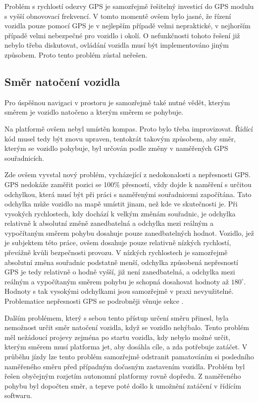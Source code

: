 \documentclass[czech, bachelor]{diploma}
\begin{document}
Problém s rychlostí odezvy GPS je samozřejmě řešitelný investicí do GPS modulu s vyšší obnovovací frekvencí. V tomto momentě ovšem
bylo jasné, že řízení vozidla pouze pomocí GPS je v nejlepším případě velmi nepraktické, v nejhorším případě velmi nebezpečné
pro vozidlo i okolí. O nefunkčnosti tohoto řešení již nebylo třeba diskutovat, ovládání vozidla musí být implementováno jiným 
způsobem. Proto tento problém zůstal neřešen.

\subsection{Směr natočení vozidla} \label{directions-and-angles}

Pro úspěšnou navigaci v prostoru je samozřejmě také nutné vědět, kterým směrem je vozidlo natočeno a kterým směrem se pohybuje.

Na platformě ovšem nebyl umístěn kompas. Proto bylo třeba improvizovat. Řídící kód musel tedy být znovu upraven, tentokrát takovým
způsobem, aby směr, kterým se vozidlo pohybuje, byl určován podle změny v naměřených GPS souřadnicích.

Zde ovšem vyvstal nový problém, vycházející z nedokonalosti a nepřesnosti GPS. GPS nedokáže zaměřit pozici se 100\% přesností,
vždy dojde k naměření s určitou odchylkou, která musí být při práci s naměřenými souřadnicemi započítána. Tato odchylka může
vozidlo na mapě umístit jinam, než kde ve skutečnosti je. Při vysokých rychlostech, kdy dochází k velkým změnám souřadnic,
je odchylka relativně k absolutní změně zanedbatelná a odchylka mezi reálným a vypočítaným směrem pohybu dosahuje pouze
zanedbatelných hodnot. Vozidlo, jež je subjektem této práce, ovšem dosahuje pouze relativně nízkých rychlostí, převážně kvůli
bezpečnosti provozu. V nízkých rychlostech je samozřejmě absolutní změna souřadnic podstatně menší, odchylka způsobená nepřesností
GPS je tedy relativně o hodně vyšší, již není zanedbatelná, a odchylka mezi reálným a vypočítaným směrem pohybu je schopná
dosahovat hodnoty až $180^{\circ}$. Hodnoty s tak vysokými odchylkami jsou samozřejmě v praxi nevyužitelné. Problematice
nepřesnosti GPS se podrobněji věnuje sekce .

Dalším problémem, který s sebou tento přístup určení směru přinesl, byla nemožnost určit směr natočení vozidla, když se vozidlo
nehýbalo. Tento problém měl nežádoucí projevy zejména po startu vozidla, kdy nebylo možné určit, kterým směrem musí platforma jet,
aby dosáhla cíle, a zda potřebuje zatáčet. V průběhu jízdy lze tento problém samozřejmě odstranit pamatováním si posledního
naměřeného směru před případným dočasným zastavením vozidla. Problém byl řešen obyčejným rozjetím autonomní platformy rovně
dopředu. Z naměřeného pohybu byl dopočten směr, a teprve poté došlo k umožnění zatáčení v řídícím softwaru.
\end{document}
